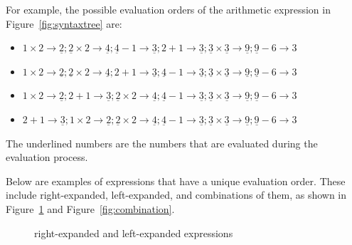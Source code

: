 For example, the possible evaluation orders of the arithmetic expression in Figure~\ref{fig:syntaxtree} are:
\begin{itemize}
  \item $1 \times 2 \rightarrow \underline{2}; \underline{2} \times 2 \rightarrow \underline{4}; \underline{4} - 1 \rightarrow \underline{3}; 2 + 1 \rightarrow \underline{3}; \underline{3} \times \underline{3} \rightarrow \underline{9}; \underline{9} - 6 \rightarrow 3$
  \item $1 \times 2 \rightarrow \underline{2}; \underline{2} \times 2 \rightarrow \underline{4}; 2 + 1 \rightarrow \underline{3}; \underline{4} - 1 \rightarrow \underline{3}; \underline{3} \times \underline{3} \rightarrow \underline{9}; \underline{9} - 6 \rightarrow 3$
  \item $1 \times 2 \rightarrow \underline{2}; 2 + 1 \rightarrow \underline{3}; \underline{2} \times 2 \rightarrow \underline{4}; \underline{4} - 1 \rightarrow \underline{3}; \underline{3} \times \underline{3} \rightarrow \underline{9}; \underline{9} - 6 \rightarrow 3$
  \item $2 + 1 \rightarrow \underline{3}; 1 \times 2 \rightarrow \underline{2}; \underline{2} \times 2 \rightarrow \underline{4}; \underline{4} - 1 \rightarrow \underline{3}; \underline{3} \times \underline{3} \rightarrow \underline{9}; \underline{9} - 6 \rightarrow 3$
\end{itemize}

The underlined numbers are the numbers that are evaluated during the evaluation process.

Below are examples of expressions that have a unique evaluation order.
These include right-expanded, left-expanded,
and combinations of them, as shown in Figure~\ref{fig:leftright} and Figure~\ref{fig:combination}.

\begin{figure}[ht]
\centering
{}
\caption{right-expanded and left-expanded expressions}\label{fig:leftright}
\end{figure}

